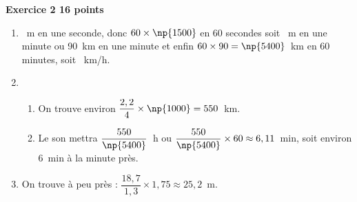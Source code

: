 \textbf{Exercice 2 \hfill 16 points}

\medskip

\begin{enumerate}
\item {}~m en une seconde, donc $60 \times \np{1500}$ en 60 secondes soit ~m en une minute ou 90~km en une minute et enfin $60 \times 90 = \np{5400}$~km en 60 minutes, soit ~km/h.
\item
	\begin{enumerate}
		\item On trouve environ $\dfrac{2,2}{4} \times \np{1000} = 550$~km.
		\item Le son mettra $\dfrac{550}{\np{5400}}$~h ou $\dfrac{550}{\np{5400}} \times 60 \approx 6,11$~min, soit environ 6~min à la minute près.
	\end{enumerate}
\item On trouve à peu près : $\dfrac{18,7}{1,3} \times 1,75 \approx 25,2$~m.
\end{enumerate}

\bigskip

